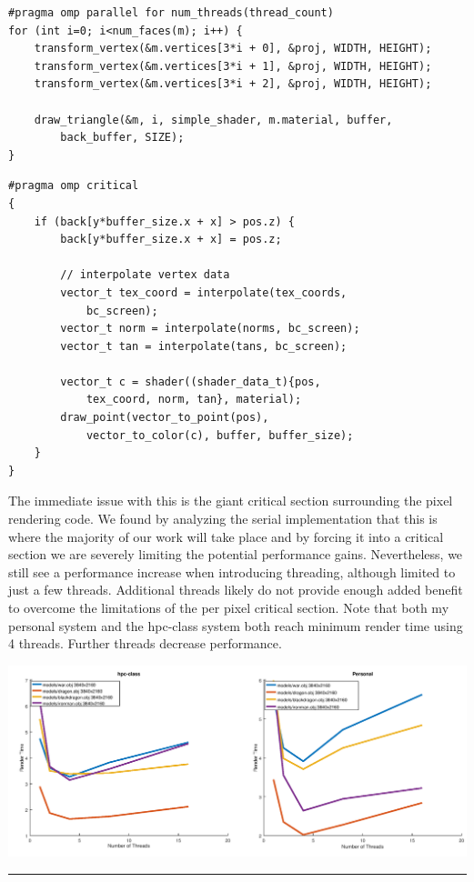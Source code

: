 \documentclass[12pt]{article}
\begin{document}
\begin{verbatim}
#pragma omp parallel for num_threads(thread_count)
for (int i=0; i<num_faces(m); i++) {
	transform_vertex(&m.vertices[3*i + 0], &proj, WIDTH, HEIGHT);
	transform_vertex(&m.vertices[3*i + 1], &proj, WIDTH, HEIGHT);
	transform_vertex(&m.vertices[3*i + 2], &proj, WIDTH, HEIGHT);

	draw_triangle(&m, i, simple_shader, m.material, buffer, 
		back_buffer, SIZE);
}
\end{verbatim}
\bigbreak
\begin{verbatim}
#pragma omp critical
{
	if (back[y*buffer_size.x + x] > pos.z) {
		back[y*buffer_size.x + x] = pos.z;

		// interpolate vertex data
		vector_t tex_coord = interpolate(tex_coords, 
			bc_screen);
		vector_t norm = interpolate(norms, bc_screen);
		vector_t tan = interpolate(tans, bc_screen);

		vector_t c = shader((shader_data_t){pos, 
			tex_coord, norm, tan}, material);
		draw_point(vector_to_point(pos), 
			vector_to_color(c), buffer, buffer_size);
	}
}
\end{verbatim}

The immediate issue with this is the giant critical section surrounding the pixel
rendering code. We found by analyzing the serial implementation that this is where the 
majority of our work will take place and by forcing it into a critical section we are
severely limiting the potential performance gains. Nevertheless, we still see a performance
increase when introducing threading, although limited to just a few threads. Additional threads
likely do not provide enough added benefit to overcome the limitations of the per 
pixel critical section.
Note that both my personal system and the hpc-class system both reach minimum render time
using 4 threads. Further threads decrease performance.

\begin{center}
	\includegraphics[width=\textwidth]{method1.png}
\end{center}
\textcolor[RGB]{200,200,200}{\rule{\textwidth}{0.75pt}}\bigbreak
\end{document}
